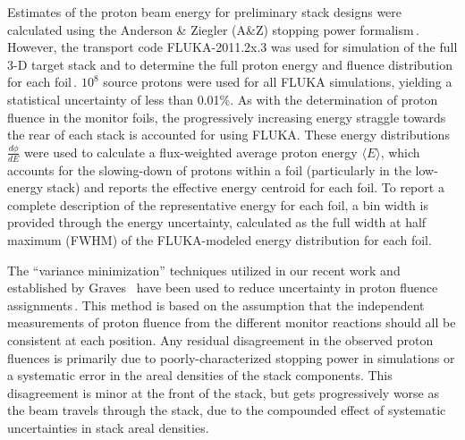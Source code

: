Estimates of the proton beam energy for preliminary stack designs were calculated using the Anderson \& Ziegler (A\&Z) stopping power formalism\,\cite{Andersen_Ziegler_1977,Ziegler1985,Ziegler1999}.
However, the 
transport code FLUKA-2011.2x.3 was used for simulation of the full 3-D target stack and to determine the full proton energy and fluence distribution for each foil\,\cite{Bohlen2014a}. 
$10^8$ source protons were used for all FLUKA simulations, 
yielding a statistical uncertainty 
of less than 0.01\%.
As with the determination of proton fluence in the monitor foils, the progressively increasing energy straggle towards the rear of each stack is accounted for using 
FLUKA.
These energy distributions $\frac{d\phi}{dE}$ were used to calculate a flux-weighted average proton  energy $\langle E \rangle$, which accounts for the slowing-down of protons within a foil (particularly in the low-energy stack) and reports the effective  energy centroid for each foil.
To report a complete description of the representative energy for each foil, a bin width is provided through the  energy uncertainty, calculated as the full width at half maximum (FWHM) of the FLUKA-modeled energy distribution for each foil.


The \enquote{variance minimization} techniques utilized in our recent work and established by Graves \etal\ have been used to reduce uncertainty in proton fluence assignments\,\cite{Voyles2018a,Graves2016}.
This method is based on the assumption that the independent measurements of proton fluence from the different monitor reactions 
should all be consistent at each 
position.
Any residual disagreement in the  observed proton fluences is  primarily due to poorly-characterized stopping power in simulations or a systematic error in the 
areal densities of the stack components. 
This disagreement is minor at the front of the stack, but gets progressively worse as the beam travels through the stack, due to the compounded effect of systematic uncertainties in stack areal densities.



